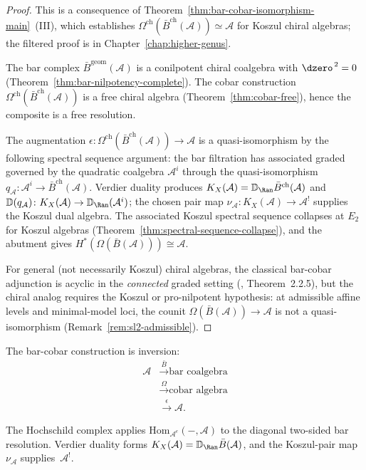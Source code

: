 \begin{proof}
This is a consequence of
Theorem~\ref{thm:bar-cobar-isomorphism-main}~(III), which establishes
$\Omega^{\mathrm{ch}}(\bar{B}^{\mathrm{ch}}(\mathcal{A})) \simeq
\mathcal{A}$ for Koszul chiral algebras; the filtered proof is in
Chapter~\ref{chap:higher-genus}.

The bar complex $\bar{B}^{\mathrm{geom}}(\mathcal{A})$ is a conilpotent
chiral coalgebra with $\dzero^{\,2} = 0$
\textup{(}Theorem~\textup{\ref{thm:bar-nilpotency-complete}}\textup{)}.
The cobar construction $\Omega^{\mathrm{ch}}(\bar{B}^{\mathrm{ch}}(\mathcal{A}))$
is a free chiral algebra
\textup{(}Theorem~\textup{\ref{thm:cobar-free}}\textup{)}, hence the
composite is a free resolution.

The augmentation
$\epsilon\colon \Omega^{\mathrm{ch}}(\bar{B}^{\mathrm{ch}}(\mathcal{A}))
\to \mathcal{A}$ is a quasi-isomorphism by the following spectral
sequence argument: the bar filtration has associated graded governed
by the quadratic coalgebra $\mathcal A^i$ through the
quasi-isomorphism
$q_\mathcal A\colon\mathcal A^i\to\bar B^{\mathrm{ch}}(\mathcal A)$.
Verdier duality produces
$K_X(\mathcal A)=\mathbb D_{\Ran}\bar B^{\mathrm{ch}}(\mathcal A)$
and
$\mathbb D(q_\mathcal A)\colon K_X(\mathcal A)\to
\mathbb D_{\Ran}(\mathcal A^i)$; the chosen pair map
$\nu_\mathcal A\colon K_X(\mathcal A)\to\mathcal A^!$ supplies the
Koszul dual algebra. The associated Koszul
spectral sequence collapses at $E_2$ for Koszul algebras
(Theorem~\ref{thm:spectral-sequence-collapse}), and the abutment gives
$H^*(\Omega(\bar{B}(\mathcal{A}))) \cong \mathcal{A}$.

For general (not necessarily Koszul) chiral algebras, the classical
bar-cobar adjunction is acyclic in the \emph{connected} graded
setting (\cite{LV12}, Theorem~2.2.5), but the chiral
analog requires the Koszul or pro-nilpotent hypothesis: at
admissible affine levels and minimal-model loci, the counit
$\Omega(\bar{B}(\mathcal{A})) \to \mathcal{A}$ is not a
quasi-isomorphism (Remark~\ref{rem:sl2-admissible}).
\end{proof}

\begin{remark}
The bar-cobar construction is inversion:
\begin{align*}
\mathcal{A} &\xrightarrow{\bar{B}} \text{bar coalgebra}\\
&\xrightarrow{\Omega} \text{cobar algebra}\\
&\xrightarrow{\epsilon} \mathcal{A}.
\end{align*}

The Hochschild complex applies
$\mathrm{Hom}_{\mathcal A^e}(-,\mathcal A)$ to the diagonal
two-sided bar resolution.  Verdier duality forms
$K_X(\mathcal A)=\mathbb D_{\Ran}\bar B(\mathcal A)$, and the
Koszul-pair map~$\nu_\mathcal A$ supplies~$\mathcal A^!$.
\end{remark}

